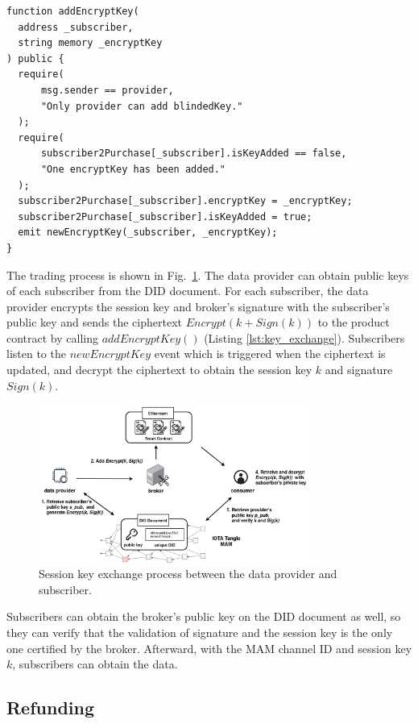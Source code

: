 \documentclass[conference]{IEEEtran}
\begin{document}
\begin{lstlisting}[caption={Update encryption key}, label={lst:key_exchange}, frame=single]
function addEncryptKey(
  address _subscriber,
  string memory _encryptKey
) public {
  require(
      msg.sender == provider,
      "Only provider can add blindedKey."
  );
  require(
      subscriber2Purchase[_subscriber].isKeyAdded == false,
      "One encryptKey has been added."
  );
  subscriber2Purchase[_subscriber].encryptKey = _encryptKey;
  subscriber2Purchase[_subscriber].isKeyAdded = true;
  emit newEncryptKey(_subscriber, _encryptKey);
}
\end{lstlisting}

The trading process is shown in Fig.~\ref{fig:key_exchange}. The data provider can obtain public keys of each subscriber from the DID document. For each subscriber, the data provider encrypts the session key and broker's signature with the subscriber's public key and sends the ciphertext $Encrypt(k + Sign(k))$ to the product contract by calling $addEncryptKey()$ (Listing \ref{lst:key_exchange}). Subscribers listen to the $newEncryptKey$ event which is triggered when the ciphertext is updated, and decrypt the ciphertext to obtain the session key $k$ and signature $Sign(k)$.

\begin{figure}[!t]
    \centering
    \includegraphics[width=3.5in]{key_exchange}
    \caption{Session key exchange process between the data provider and subscriber.}
    \label{fig:key_exchange}
\end{figure}

Subscribers can obtain the broker's public key on the DID document as well, so they can verify that the validation of signature and the session key is the only one certified by the broker. Afterward, with the MAM channel ID and session key $k$, subscribers can obtain the data.

\subsection{Refunding}
\end{document}
